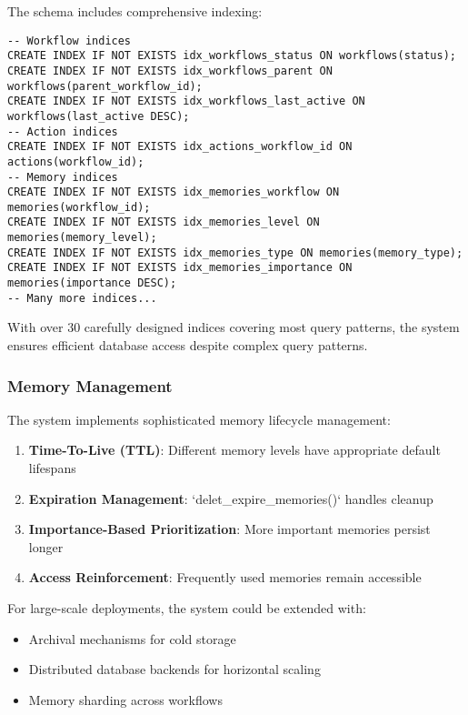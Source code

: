 \documentclass[12pt,a4paper]{article}
\begin{document}
The schema includes comprehensive indexing:
\begin{pageablecode}
\begin{verbatim}
-- Workflow indices
CREATE INDEX IF NOT EXISTS idx_workflows_status ON workflows(status);
CREATE INDEX IF NOT EXISTS idx_workflows_parent ON workflows(parent_workflow_id);
CREATE INDEX IF NOT EXISTS idx_workflows_last_active ON workflows(last_active DESC);
-- Action indices
CREATE INDEX IF NOT EXISTS idx_actions_workflow_id ON actions(workflow_id);
-- Memory indices
CREATE INDEX IF NOT EXISTS idx_memories_workflow ON memories(workflow_id);
CREATE INDEX IF NOT EXISTS idx_memories_level ON memories(memory_level);
CREATE INDEX IF NOT EXISTS idx_memories_type ON memories(memory_type);
CREATE INDEX IF NOT EXISTS idx_memories_importance ON memories(importance DESC);
-- Many more indices...
\end{verbatim}
\end{pageablecode}
With over 30 carefully designed indices covering most query patterns, the system ensures efficient database access despite complex query patterns.

\subsubsection*{Memory Management}

The system implements sophisticated memory lifecycle management:

\begin{enumerate}[label=\arabic*.]
    \item \textbf{Time-To-Live (TTL)}: Different memory levels have appropriate default lifespans
    \item \textbf{Expiration Management}: `delet\1\_expire\1\_memories()` handles cleanup
    \item \textbf{Importance-Based Prioritization}: More important memories persist longer
    \item \textbf{Access Reinforcement}: Frequently used memories remain accessible
\end{enumerate}

For large-scale deployments, the system could be extended with:
\begin{itemize}
    \item Archival mechanisms for cold storage
    \item Distributed database backends for horizontal scaling
    \item Memory sharding across workflows
\end{itemize}
\end{document}
